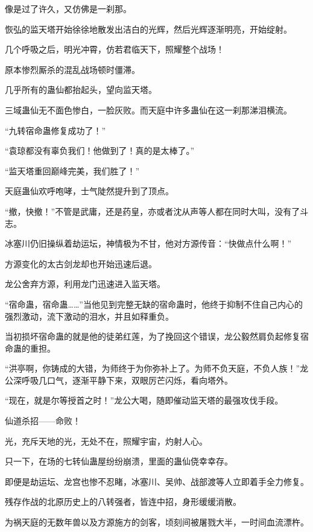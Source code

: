 
\begin{this_body}

像是过了许久，又仿佛是一刹那。

恢弘的监天塔开始徐徐地散发出洁白的光辉，然后光辉逐渐明亮，开始绽射。

几个呼吸之后，明光冲霄，仿若君临天下，照耀整个战场！

原本惨烈厮杀的混乱战场顿时僵滞。

几乎所有的蛊仙都抬起头，望向监天塔。

三域蛊仙无不面色惨白，一脸灰败。而天庭中许多蛊仙在这一刹那涕泪横流。

“九转宿命蛊修复成功了！”

“袁琼都没有辜负我们！他做到了！真的是太棒了。”

“监天塔重回巅峰完美，我们胜了！”

天庭蛊仙欢呼咆哮，士气陡然提升到了顶点。

“撤，快撤！”不管是武庸，还是药皇，亦或者沈从声等人都在同时大叫，没有了斗志。

冰塞川仍旧操纵着劫运坛，神情极为不甘，他对方源传音：“快做点什么啊！”

方源变化的太古剑龙却也开始迅速后退。

龙公舍弃方源，利用龙门迅速进入监天塔。

“宿命蛊，宿命蛊……”当他见到完整无缺的宿命蛊时，他终于抑制不住自己内心的强烈激动，流下激动的泪水，并且如释重负。

当初损坏宿命蛊的就是他的徒弟红莲，为了挽回这个错误，龙公毅然肩负起修复宿命蛊的重担。

“洪亭啊，你铸成的大错，为师终于为你弥补上了。为师不负天庭，不负人族！”龙公深呼吸几口气，逐渐平静下来，双眼厉芒闪烁，看向塔外。

“现在，就是尔等授首之时！”龙公大喝，随即催动监天塔的最强攻伐手段。

仙道杀招——命败！

光，充斥天地的光，无处不在，照耀宇宙，灼射人心。

只一下，在场的七转仙蛊屋纷纷崩溃，里面的蛊仙侥幸幸存。

即便是劫运坛、龙宫也惨不忍睹，冰塞川、吴帅、战部渡等人立即着手全力修复。

残存作战的北原历史上的八转强者，皆连中招，身形缓缓消散。

为祸天庭的无数年兽以及方源施方的剑客，顷刻间被屠戮大半，一时间血流漂杵。


\end{this_body}
